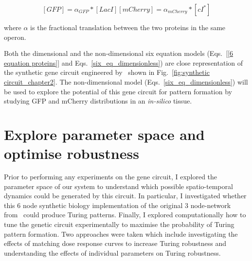 \begin{subequations}
    \begin{equation}
        [GFP] = \alpha_{GFP}*[LacI]
    \end{equation}
    \begin{equation}
        [mCherry] = \alpha_{mCherry}*[cI^*]
    \end{equation}
\end{subequations}

where $\alpha$ is the fractional translation between the two proteins in the same operon.


Both the dimensional and the non-dimensional six equation models (Eqs.~\ref{[6 equation proteins]} and Eqs.~\ref{six_eq_dimensionless}) are close representation of the synthetic gene circuit engineered by~\cite{Tica2020} shown in Fig.~\ref{fig:synthetic circuit_chapter2}.
The non-dimensional model (Eqs.~\ref{six_eq_dimensionless}) will be used to explore the potential of this gene circuit for pattern formation by studying GFP and mCherry distributions in an \textit{in-silico} tissue.



\section{Explore parameter space and optimise robustness}
Prior to performing any experiments on the gene circuit, I explored the parameter space of our system to understand which possible spatio-temporal dynamics could be generated by this circuit.
In particular, I investigated whether this 6 node synthetic biology implementation of the original 3 node-network from~\cite{Scholes2019} could produce Turing patterns.
Finally, I explored computationally how to tune the genetic circuit experimentally to maximise the probability of Turing pattern formation.
Two approaches were taken which include investigating the effects of matching dose response curves to increase Turing robustness and understanding the effects of individual parameters on Turing robustness.

